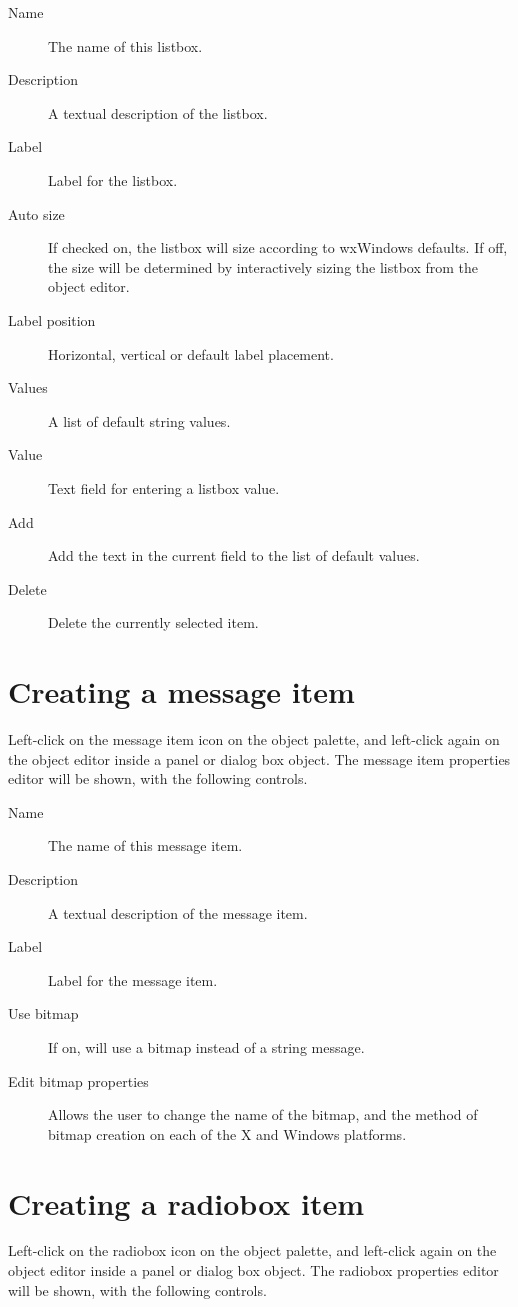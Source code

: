 \begin{description}
\item[Name] The name of this listbox.
\item[Description] A textual description of the listbox.
\item[Label] Label for the listbox.
\item[Auto size] If checked on, the listbox will size according to
wxWindows defaults. If off, the size will be determined by interactively sizing
the listbox from the object editor.
\item[Label position] Horizontal, vertical or default label placement.
\item[Values] A list of default string values.
\item[Value] Text field for entering a listbox value.
\item[Add] Add the text in the current field to the list of default values.
\item[Delete] Delete the currently selected item.
\end{description}

\section{Creating a message item}

Left-click on the message item icon on the object palette, and left-click
again on the object editor inside a panel or dialog box object. The
message item properties editor will be shown, with the following
controls.

\begin{description}
\item[Name] The name of this message item.
\item[Description] A textual description of the message item.
\item[Label] Label for the message item.
\item[Use bitmap] If on, will use a bitmap instead of a string message.
\item[Edit bitmap properties] Allows the user to change the name of the bitmap,
and the method of bitmap creation on each of the X and Windows platforms.
\end{description}

\section{Creating a radiobox item}

Left-click on the radiobox icon on the object palette, and left-click
again on the object editor inside a panel or dialog box object. The
radiobox properties editor will be shown, with the following
controls.


